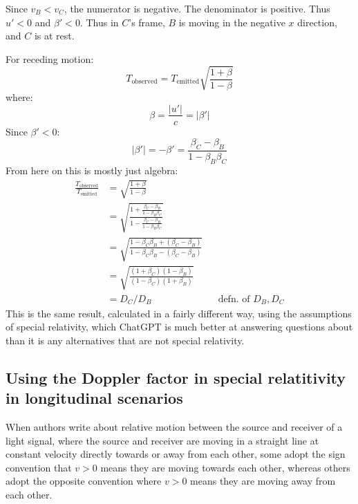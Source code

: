 \documentclass[a4paper]{article}
\theoremstyle{plain}
\theoremstyle{definition}
\begin{document}
Since $v_B < v_C$, the numerator is negative.  The denominator is
positive.  Thus $u' < 0$ and $\beta' < 0$.  Thus in $C$'s frame, $B$
is moving in the negative $x$ direction, and $C$ is at rest.

For receding motion:
\begin{equation}
T_{\text{observed}} = T_{\text{emitted}} \sqrt{ \frac{1+\beta}{1-\beta} }
\end{equation}
where:
\begin{equation}
\beta = \frac{|u'|}{c} = |\beta'|
\end{equation}
Since $\beta' < 0$:
\begin{equation}
|\beta'| = -\beta' = \frac{\beta_C - \beta_B}{1 - \beta_B \beta_C}
\end{equation}
From here on this is mostly just algebra:
\begin{align*}
\frac{T_{\text{observed}}}{T_{\text{emitted}}}
  & = \sqrt{ \frac{1+\beta}{1-\beta} } \\
  & = \sqrt{ \frac{1 + \frac{\beta_C - \beta_B}{1 - \beta_B \beta_C}}{1 - \frac{\beta_C - \beta_B}{1 - \beta_B \beta_C}} } \\
  & = \sqrt{ \frac{1 - \beta_C \beta_B + (\beta_C - \beta_B)}{1 - \beta_C \beta_B - (\beta_C - \beta_B)} } \\
  & = \sqrt{ \frac{(1 + \beta_C) (1 - \beta_B)}{(1 - \beta_C) (1 + \beta_B)} } \\
  & = D_C / D_B & & \text{defn. of $D_B, D_C$}
\end{align*}
This is the same result, calculated in a fairly different way, using
the assumptions of special relativity, which ChatGPT is much better at
answering questions about than it is any alternatives that are not
special relativity.


\subsection{Using the Doppler factor in special relatitivity in longitudinal scenarios}
\label{sec:DopplerFactorSignConvention}

When authors write about relative motion between the source and
receiver of a light signal, where the source and receiver are moving
in a straight line at constant velocity directly towards or away from
each other, some adopt the sign convention that $v > 0$ means they are
moving towards each other, whereas others adopt the opposite
convention where $v > 0$ means they are moving away from each other.
\end{document}
